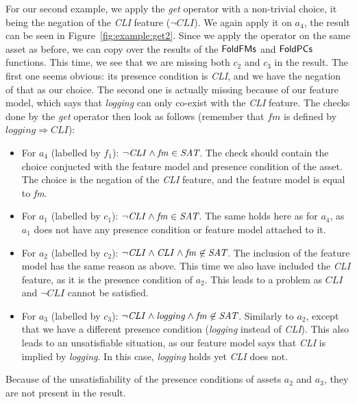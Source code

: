\begin{example}
For our second example, we apply the \emph{get} operator with a non-trivial choice, it being
the negation of the \emph{CLI} feature (\(\neg\mathit{CLI}\)). We again apply it on $a_4$, the
result can be seen in Figure~\ref{fig:example:get2}. Since we apply the operator on the same
asset as before, we can copy over the results of the \({\sf FoldFMs}\) and \({\sf FoldPCs}\)
functions. This time, we see that we are missing both $c_2$ and $c_3$ in the result. The first
one seems obvious: its presence condition is \emph{CLI}, and we have the negation of that as our
choice. The second one is actually missing because of our feature model, which says that
\emph{logging} can only co-exist with the \emph{CLI} feature. The checks done by the \emph{get}
operator then look as follows (remember that \(\mathit{fm}\) is defined by
\(\mathit{logging} \Rightarrow \mathit{CLI}\)):

\begin{itemize}
  \item For $a_4$ (labelled by $f_1$): \(\neg\mathit{CLI} \land \mathit{fm}\in\textit{SAT}\).
        The check should contain the choice conjucted with the feature model and presence condition
        of the asset. The choice is the negation of the \emph{CLI} feature, and the feature model
        is equal to \emph{fm}.
  \item For $a_1$ (labelled by $c_1$): \(\neg\mathit{CLI} \land \mathit{fm}\in\textit{SAT}\). The same holds
        here as for $a_4$,
        as $a_1$ does not have any presence condition or feature model attached to it.
  \item For $a_2$ (labelled by $c_2$): \(\neg\mathit{CLI} \land \mathit{CLI} \land \mathit{fm} \not\in \textit{SAT}\).
        The inclusion of the feature model has the same reason as above. This time we also have included the
        \emph{CLI} feature, as it is the presence condition of $a_2$. This leads to a problem as \(\mathit{CLI}\) and \(\neg\mathit{CLI}\) cannot be satisfied.
  \item For $a_3$ (labelled by $c_3$): \(\neg\mathit{CLI} \land \mathit{logging} \land \mathit{fm} \not\in \textit{SAT}\). Similarly
        to $a_2$, except that we have a different presence condition (\emph{logging} instead of
        \emph{CLI}). This also leads to an unsatisfiable situation, as our feature model says that
        \emph{CLI} is implied by \emph{logging}. In this case, \emph{logging} holds yet \emph{CLI} does not.
\end{itemize}
Because of the unsatisfiability of the presence conditions of assets $a_2$ and $a_3$, they are not present in the result.
\end{example}

